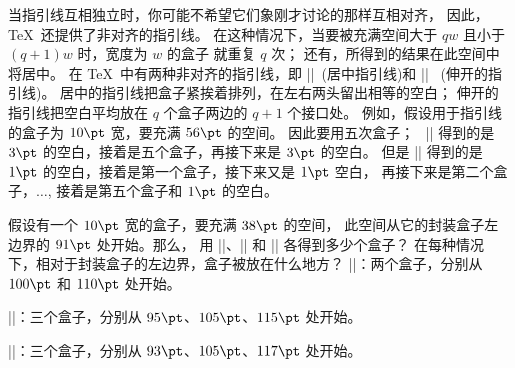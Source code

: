 \ddanger 当指引线互相独立时，你可能不希望它们象刚才讨论的那样互相对齐，
因此， \TeX\ 还提供了非对齐的指引线。%
在这种情况下，当要被充满空间大于 $qw$ 且小于 $(q+1)w$ 时，宽度为 $w$ 的盒子%
就重复 $q$ 次；
还有，所得到的结果在此空间中将居中。%
在 \TeX\ 中有两种非对齐的指引线，即 |\cleaders|~(居中指引线)和 |\xleaders|~%
(伸开的指引线)。%
居中的指引线把盒子紧挨着排列，在左右两头留出相等的空白；
伸开的指引线把空白平均放在 $q$ 个盒子两边的 $q+1$ 个接口处。%
例如，假设用于指引线的盒子为 $10\pt$ 宽，要充满 $56\pt$ 的空间。%
因此要用五次盒子；
~|\cleaders| 得到的是 $3\pt$ 的空白，接着是五个盒子，再接下来是 $3\pt$ 的空白。%
但是 |\xleaders| 得到的是 $1\pt$ 的空白，接着是第一个盒子，接下来又是 $1\pt$ 空白，
再接下来是第二个盒子，$\ldots$, 接着是第五个盒子和 $1\pt$ 的空白。

\ddangerexercise 假设有一个 $10\pt$ 宽的盒子，要充满 $38\pt$ 的空间，
此空间从它的封装盒子左边界的 $91\pt$ 处开始。那么，
用 |\leaders|、|\cleaders| 和 |\xleaders| 各得到多少个盒子？
在每种情况下，相对于封装盒子的左边界，盒子被放在什么地方？
\answer |\leaders|：两个盒子，分别从 $100\pt$ 和 $110\pt$ 处开始。\par
|\cleaders|：三个盒子，分别从 $95\pt$、$105\pt$、$115\pt$ 处开始。\par
|\xleaders|：三个盒子，分别从 $93\pt$、$105\pt$、$117\pt$ 处开始。

